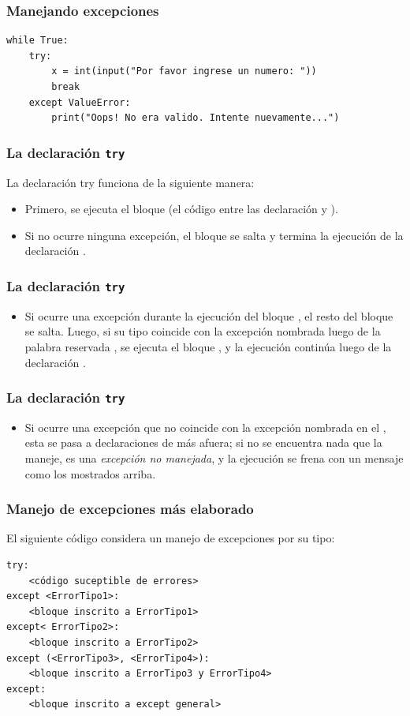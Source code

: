 \begin{frame}[fragile]
\frametitle{Manejando excepciones}
\begin{lstlisting}
while True:
    try:
        x = int(input("Por favor ingrese un numero: "))
        break
    except ValueError:
        print("Oops! No era valido. Intente nuevamente...")
\end{lstlisting}
\end{frame}
\begin{frame}
\frametitle{La declaración \texttt{try}}
La declaración try funciona de la siguiente manera:
\begin{itemize}[<+->]
\item Primero, se ejecuta el bloque  (el código entre las declaración  y ).
\item  Si no ocurre ninguna excepción, el bloque  se salta y termina la ejecución de la declaración .
\end{itemize}
\end{frame}
\begin{frame}
\frametitle{La declaración \texttt{try}}
\begin{itemize}[<+->]
\item  Si ocurre una excepción durante la ejecución del bloque , el resto del bloque se salta. Luego, si su tipo coincide con la excepción nombrada luego de la palabra reservada , se ejecuta el bloque , y la ejecución continúa luego de la declaración .
\end{itemize}
\end{frame}
\begin{frame}
\frametitle{La declaración \texttt{try}}
\begin{itemize}[<+->]
\item Si ocurre una excepción que no coincide con la excepción nombrada en el , esta se pasa a declaraciones  de más afuera; si no se encuentra nada que la maneje, es una \emph{excepción no manejada}, y la ejecución se frena con un mensaje como los mostrados arriba.
\end{itemize}
\end{frame}
\begin{frame}[fragile]
\frametitle{Manejo de excepciones más elaborado}
El siguiente código considera un manejo de excepciones por su tipo:
\fontsize{12}{11}\selectfont
\begin{verbatim}
try:
    <código suceptible de errores>
except <ErrorTipo1>:
    <bloque inscrito a ErrorTipo1>
except< ErrorTipo2>:
    <bloque inscrito a ErrorTipo2>
except (<ErrorTipo3>, <ErrorTipo4>):
    <bloque inscrito a ErrorTipo3 y ErrorTipo4>
except:
    <bloque inscrito a except general>
\end{verbatim}
\end{frame}
